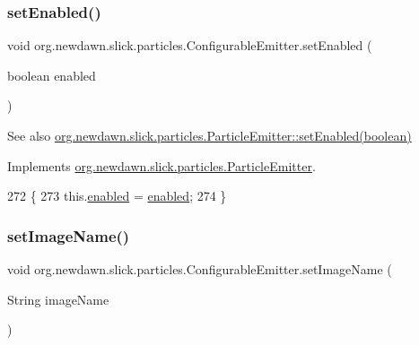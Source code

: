 \subsubsection{\texorpdfstring{set\+Enabled()}{setEnabled()}}
{\footnotesize\ttfamily void org.\+newdawn.\+slick.\+particles.\+Configurable\+Emitter.\+set\+Enabled (\begin{DoxyParamCaption}\item[{boolean}]{enabled }\end{DoxyParamCaption})\hspace{0.3cm}{\ttfamily [inline]}}

\begin{DoxySeeAlso}{See also}
\mbox{\hyperlink{interfaceorg_1_1newdawn_1_1slick_1_1particles_1_1_particle_emitter_a0db4bbc7bb9b5cc2b828993e065db057}{org.\+newdawn.\+slick.\+particles.\+Particle\+Emitter\+::set\+Enabled(boolean)}} 
\end{DoxySeeAlso}


Implements \mbox{\hyperlink{interfaceorg_1_1newdawn_1_1slick_1_1particles_1_1_particle_emitter_a0db4bbc7bb9b5cc2b828993e065db057}{org.\+newdawn.\+slick.\+particles.\+Particle\+Emitter}}.


\begin{DoxyCode}
272                                             \{
273         this.\mbox{\hyperlink{classorg_1_1newdawn_1_1slick_1_1particles_1_1_configurable_emitter_a946084290596958350688f1e02b6e611}{enabled}} = \mbox{\hyperlink{classorg_1_1newdawn_1_1slick_1_1particles_1_1_configurable_emitter_a946084290596958350688f1e02b6e611}{enabled}};
274     \}
\end{DoxyCode}
\mbox{\label{classorg_1_1newdawn_1_1slick_1_1particles_1_1_configurable_emitter_aa4bbab57939ae64a1a3fd83704df7065}} 
\subsubsection{\texorpdfstring{set\+Image\+Name()}{setImageName()}}
{\footnotesize\ttfamily void org.\+newdawn.\+slick.\+particles.\+Configurable\+Emitter.\+set\+Image\+Name (\begin{DoxyParamCaption}\item[{String}]{image\+Name }\end{DoxyParamCaption})\hspace{0.3cm}{\ttfamily [inline]}}

